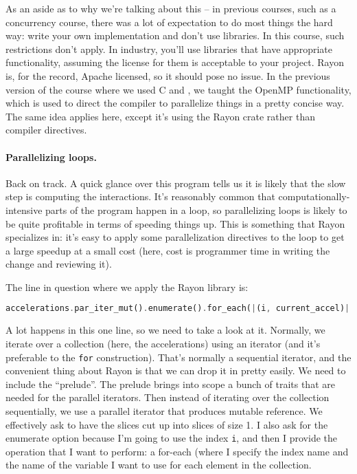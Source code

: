As an aside as to why we're talking about this -- in previous courses, such as a concurrency course, there was a lot of expectation to do most things the hard way: write your own implementation and don't use libraries. In this course, such restrictions don't apply. In industry, you'll use libraries that have appropriate functionality, assuming the license for them is acceptable to your project. Rayon is, for the record, Apache licensed, so it should pose no issue. In the previous version of the course where we used C and \CPP, we taught the OpenMP functionality, which is used to direct the compiler to parallelize things in a pretty concise way. The same idea applies here, except it's using the Rayon crate rather than compiler directives.

\paragraph{Parallelizing loops.} Back on track. A quick glance over this program tells us it is likely that the slow step is computing the interactions. It's reasonably common that computationally-intensive parts of the program happen in a loop, so parallelizing loops is likely to be quite profitable in terms of speeding things up. This is something that Rayon specializes in: it's easy to apply some parallelization directives to the loop to get a large speedup at a small cost (here, cost is programmer time in writing the change and reviewing it).

The line in question where we apply the Rayon library is:
\begin{lstlisting}[language=Rust]
accelerations.par_iter_mut().enumerate().for_each(|(i, current_accel)| {
\end{lstlisting}

A lot happens in this one line, so we need to take a look at it. Normally, we iterate over a collection (here, the accelerations) using an iterator (and it's preferable to the \texttt{for} construction). That's normally a sequential iterator, and the convenient thing about Rayon is that we can drop it in pretty easily. We need to include the ``prelude''. The prelude brings into scope a bunch of traits that are needed for the parallel iterators. Then instead of iterating over the collection sequentially, we use a parallel iterator that produces mutable reference. We effectively ask to have the slices cut up into slices of size 1. I also ask for the enumerate option because I'm going to use the index \texttt{i}, and then I provide the operation that I want to perform: a for-each (where I specify the index name and the name of the variable I want to use for each element in the collection. 

